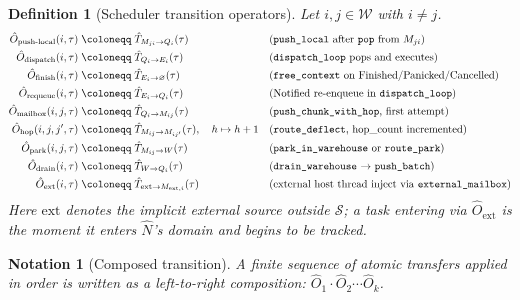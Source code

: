 \documentclass[11pt,a4paper]{report}
\newtheorem{definition}{Definition}[section]
\newtheorem{notation}{Notation}[section]
\newcommand{\Num}{\hat{N}}
\newcommand{\Trf}[2]{\hat{T}_{#1 \to #2}}
\newcommand{\code}[1]{\texttt{#1}}
\begin{document}
\begin{definition}[Scheduler transition operators]
\label{def:ops}
Let $i, j \in \mathcal{W}$ with $i \neq j$.
\begin{align}
  \hat{O}_{\text{push-local}}(i, \tau) &\;\coloneqq\;
    \Trf{M_{ji}}{Q_i}(\tau)
    &&\text{(\code{push\_local} after \code{pop} from } M_{ji}\text{)}
    \label{eq:push-local}\\
  \hat{O}_{\text{dispatch}}(i, \tau) &\;\coloneqq\;
    \Trf{Q_i}{E_i}(\tau)
    &&\text{(\code{dispatch\_loop} pops and executes)}
    \label{eq:dispatch}\\
  \hat{O}_{\text{finish}}(i, \tau) &\;\coloneqq\;
    \Trf{E_i}{\varnothing}(\tau)
    &&\text{(\code{free\_context} on Finished/Panicked/Cancelled)}
    \label{eq:finish}\\
  \hat{O}_{\text{requeue}}(i, \tau) &\;\coloneqq\;
    \Trf{E_i}{Q_i}(\tau)
    &&\text{(Notified re-enqueue in \code{dispatch\_loop})}
    \label{eq:requeue}\\
  \hat{O}_{\text{mailbox}}(i,j,\tau) &\;\coloneqq\;
    \Trf{Q_i}{M_{ij}}(\tau)
    &&\text{(\code{push\_chunk\_with\_hop}, first attempt)}
    \label{eq:mailbox}\\
  \hat{O}_{\text{hop}}(i,j,j',\tau) &\;\coloneqq\;
    \Trf{M_{ij}}{M_{ij'}}(\tau),\quad h \mapsto h+1
    &&\text{(\code{route\_deflect}, hop\_count incremented)}
    \label{eq:hop}\\
  \hat{O}_{\text{park}}(i,j,\tau) &\;\coloneqq\;
    \Trf{M_{ij}}{W}(\tau)
    &&\text{(\code{park\_in\_warehouse} or \code{route\_park})}
    \label{eq:park}\\
  \hat{O}_{\text{drain}}(i,\tau) &\;\coloneqq\;
    \Trf{W}{Q_i}(\tau)
    &&\text{(\code{drain\_warehouse} \(\to\) \code{push\_batch})}
    \label{eq:drain}\\
  \hat{O}_{\text{ext}}(i,\tau) &\;\coloneqq\;
    \Trf{\text{ext}}{M_{\text{ext},i}}(\tau)
    &&\text{(external host thread inject via \code{external\_mailbox})}
    \label{eq:ext}
\end{align}
Here \(\text{ext}\) denotes the implicit external source outside
$\mathcal{S}$; a task entering via $\hat{O}_{\text{ext}}$ is the
moment it \emph{enters} $\Num$'s domain and begins to be tracked.
\end{definition}

\begin{notation}[Composed transition]
A finite sequence of atomic transfers applied in order is written as
a left-to-right composition:
$\hat{O}_1 \cdot \hat{O}_2 \cdots \hat{O}_k$.
\end{notation}
\end{document}
